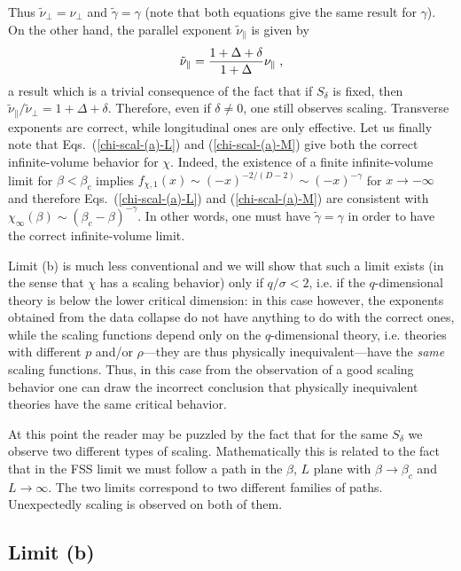 \documentclass[a4paper,12pt]{article}
\begin{document}
Thus $\tilde{\nu}_\bot = \nu_\bot$ and $\tilde{\gamma} = \gamma$ (note that 
both equations give the same result for $\gamma$).
On the other hand,
the parallel exponent ${\tilde\nu}_\|$ is given by
\begin{equation}
{\tilde\nu}_\| = {1 + \Delta + \delta\over 1 + \Delta}  \nu_\|\; ,
\end{equation}
a result which is a trivial consequence of the fact that if $S_\delta$
is fixed, then ${\tilde\nu}_\|/{\tilde\nu}_\bot = 1 + \Delta + \delta$.
Therefore, even if $\delta \not = 0$, one still observes scaling. 
Transverse exponents are correct, while longitudinal ones are only effective.
Let us finally note that Eqs.~(\ref{chi-scal-(a)-L}) and 
(\ref{chi-scal-(a)-M}) give both the correct infinite-volume behavior 
for $\chi$. Indeed, the existence of a finite infinite-volume limit 
for $\beta < \beta_c$ implies $f_{\chi,1}(x) \sim (-x)^{-2/(D-2)} \sim 
(-x)^{-\gamma}$ for $x\to-\infty$ and therefore 
 Eqs.~(\ref{chi-scal-(a)-L}) and (\ref{chi-scal-(a)-M}) 
are consistent with $\chi_\infty(\beta) \sim (\beta_c - \beta)^{-\gamma}$.
In other words, one must have $\tilde{\gamma} = \gamma$ in order to 
have the correct infinite-volume limit.

Limit (b) is much less conventional and 
we will show that such a limit exists (in the sense that 
$\chi$ has a scaling behavior) only if $q/\sigma < 2$, i.e.
if the $q$-dimensional theory is below the lower critical dimension:
in this case however, the exponents obtained from the data collapse do not have 
anything to do with the correct ones, while the scaling functions
depend only on the $q$-dimensional theory, i.e. theories with different 
$p$ and/or $\rho$---they are thus physically inequivalent---have the 
{\em same} scaling functions. Thus, in this case from the observation of 
a good scaling behavior one can draw the incorrect conclusion that 
physically inequivalent theories have the same critical behavior.

At this point the reader may be puzzled by the fact that for the same 
$S_\delta$ we observe two different types of scaling. 
Mathematically this is related to the fact that in the FSS limit we must follow 
a path in the $\beta$, $L$ plane with $\beta\to\beta_c$ and $L\to\infty$. 
The two limits correspond to two different families of paths. 
Unexpectedly scaling is observed on both of them.

\subsection{Limit (b)} \label{sec4.2}
\end{document}
